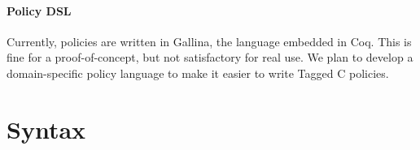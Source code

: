 \documentclass{llncs}
\begin{document}
\paragraph{Policy DSL}

Currently, policies are written in Gallina, the language embedded in Coq. This is fine for a
proof-of-concept, but not satisfactory for real use. We plan to develop a domain-specific policy
language to make it easier to write Tagged C policies.




\appendix

\section{Syntax}
\end{document}

